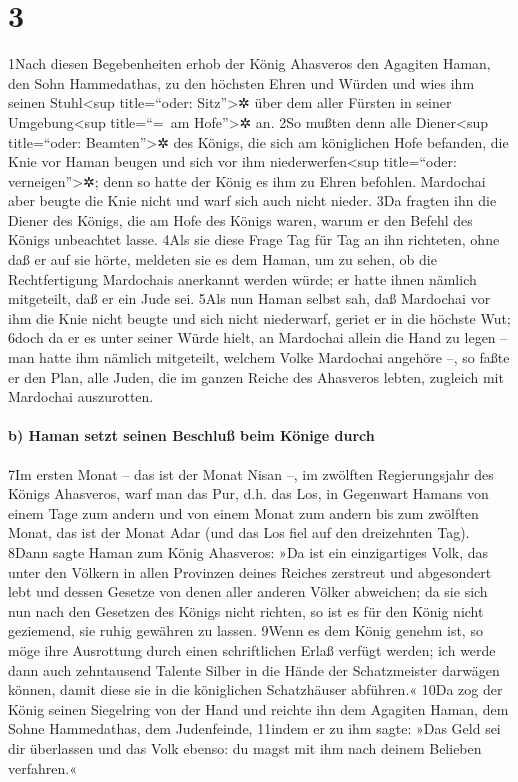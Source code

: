 \hypertarget{section-2}{%
\section{3}\label{section-2}}

1Nach diesen Begebenheiten erhob der König Ahasveros den Agagiten Haman,
den Sohn Hammedathas, zu den höchsten Ehren und Würden und wies ihm
seinen Stuhl\textless sup title=``oder: Sitz''\textgreater✲ über dem
aller Fürsten in seiner Umgebung\textless sup title=``=~am
Hofe''\textgreater✲ an. 2So mußten denn alle Diener\textless sup
title=``oder: Beamten''\textgreater✲ des Königs, die sich am königlichen
Hofe befanden, die Knie vor Haman beugen und sich vor ihm
niederwerfen\textless sup title=``oder: verneigen''\textgreater✲; denn
so hatte der König es ihm zu Ehren befohlen. Mardochai aber beugte die
Knie nicht und warf sich auch nicht nieder. 3Da fragten ihn die Diener
des Königs, die am Hofe des Königs waren, warum er den Befehl des Königs
unbeachtet lasse. 4Als sie diese Frage Tag für Tag an ihn richteten,
ohne daß er auf sie hörte, meldeten sie es dem Haman, um zu sehen, ob
die Rechtfertigung Mardochais anerkannt werden würde; er hatte ihnen
nämlich mitgeteilt, daß er ein Jude sei. 5Als nun Haman selbst sah, daß
Mardochai vor ihm die Knie nicht beugte und sich nicht niederwarf,
geriet er in die höchste Wut; 6doch da er es unter seiner Würde hielt,
an Mardochai allein die Hand zu legen -- man hatte ihm nämlich
mitgeteilt, welchem Volke Mardochai angehöre --, so faßte er den Plan,
alle Juden, die im ganzen Reiche des Ahasveros lebten, zugleich mit
Mardochai auszurotten.

\hypertarget{b-haman-setzt-seinen-beschluuxdf-beim-kuxf6nige-durch}{%
\paragraph{b) Haman setzt seinen Beschluß beim Könige
durch}\label{b-haman-setzt-seinen-beschluuxdf-beim-kuxf6nige-durch}}

7Im ersten Monat -- das ist der Monat Nisan --, im zwölften
Regierungsjahr des Königs Ahasveros, warf man das Pur, d.h. das Los, in
Gegenwart Hamans von einem Tage zum andern und von einem Monat zum
andern bis zum zwölften Monat, das ist der Monat Adar (und das Los fiel
auf den dreizehnten Tag). 8Dann sagte Haman zum König Ahasveros: »Da ist
ein einzigartiges Volk, das unter den Völkern in allen Provinzen deines
Reiches zerstreut und abgesondert lebt und dessen Gesetze von denen
aller anderen Völker abweichen; da sie sich nun nach den Gesetzen des
Königs nicht richten, so ist es für den König nicht geziemend, sie ruhig
gewähren zu lassen. 9Wenn es dem König genehm ist, so möge ihre
Ausrottung durch einen schriftlichen Erlaß verfügt werden; ich werde
dann auch zehntausend Talente Silber in die Hände der Schatzmeister
darwägen können, damit diese sie in die königlichen Schatzhäuser
abführen.« 10Da zog der König seinen Siegelring von der Hand und reichte
ihn dem Agagiten Haman, dem Sohne Hammedathas, dem Judenfeinde, 11indem
er zu ihm sagte: »Das Geld sei dir überlassen und das Volk ebenso: du
magst mit ihm nach deinem Belieben verfahren.«

